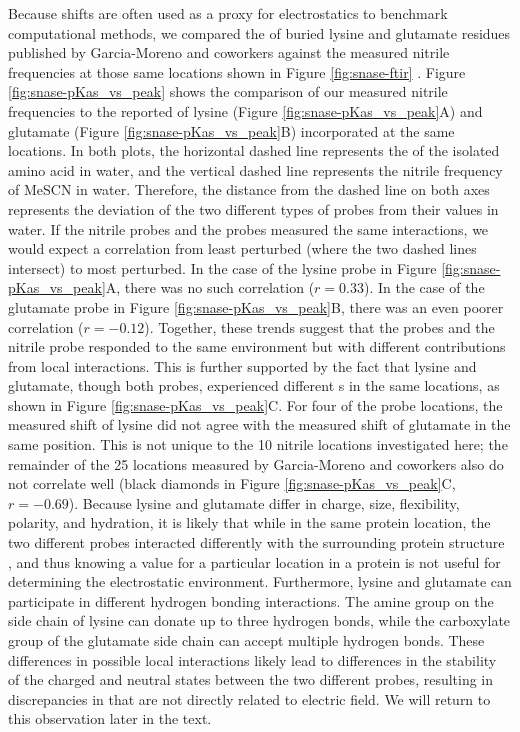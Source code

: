 Because \pKa{} shifts are often used as a proxy for electrostatics to benchmark computational methods, we compared the \dpKa{} of buried lysine and glutamate residues published by Garcia-Moreno and coworkers against the measured nitrile frequencies at those same locations shown in Figure \ref{fig:snase-ftir} \cite{Isom2010, Isom2011}. 
Figure \ref{fig:snase-pKas_vs_peak} shows the comparison of our measured nitrile frequencies to the reported \pKa{} of lysine (Figure \ref{fig:snase-pKas_vs_peak}A) and glutamate (Figure \ref{fig:snase-pKas_vs_peak}B) incorporated at the same locations. 
In both plots, the horizontal dashed line represents the \pKa{} of the isolated amino acid in water, and the vertical dashed line represents the nitrile frequency of MeSCN in water. 
Therefore, the distance from the dashed line on both axes represents the deviation of the two different types of probes from their values in water. 
If the nitrile probes and the \pKa{} probes measured the same interactions, we would expect a correlation from least perturbed (where the two dashed lines intersect) to most perturbed. 
In the case of the lysine probe in Figure \ref{fig:snase-pKas_vs_peak}A, there was no such correlation ($r = 0.33$). 
In the case of the glutamate probe in Figure \ref{fig:snase-pKas_vs_peak}B, there was an even poorer correlation ($r = -0.12$). 
Together, these trends suggest that the \pKa{} probes and the nitrile probe responded to the same environment but with different contributions from local interactions. 
This is further supported by the fact that lysine and glutamate, though both \pKa{} probes, experienced different \dpKa{}s in the same locations, as shown in Figure \ref{fig:snase-pKas_vs_peak}C. 
For four of the probe locations, the measured \pKa{} shift of lysine did not agree with the measured \pKa{} shift of glutamate in the same position. 
This is not unique to the 10 nitrile locations investigated here; 
the remainder of the 25 locations measured by Garcia-Moreno and coworkers also do not correlate well (black diamonds in Figure \ref{fig:snase-pKas_vs_peak}C, $r = -0.69$). 
Because lysine and glutamate differ in charge, size, flexibility, polarity, and hydration, it is likely that while in the same protein location, the two different \pKa{} probes interacted differently with the surrounding protein structure \cite{Harms2009, Isom2011}, and thus knowing a \dpKa{} value for a particular location in a protein is not useful for determining the electrostatic environment. 
Furthermore, lysine and glutamate can participate in different hydrogen bonding interactions. 
The amine group on the side chain of lysine can donate up to three hydrogen bonds, while the carboxylate group of the glutamate side chain can accept multiple hydrogen bonds. 
These differences in possible local interactions likely lead to differences in the stability of the charged and neutral states between the two different \pKa{} probes, resulting in discrepancies in \dpKa{} that are not directly related to electric field. 
We will return to this observation later in the text.

